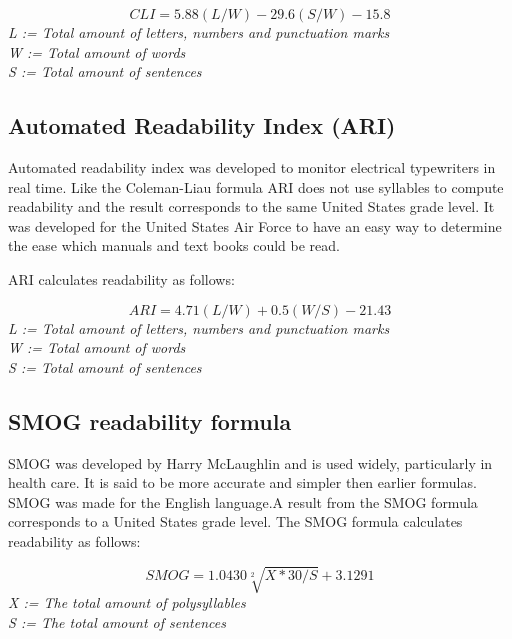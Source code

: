 \documentclass[a4paper]{article}
\begin{document}
\begin{equation}
CLI = 5.88(L/W) - 29.6(S/W) - 15.8
\end{equation}
\emph{L := Total amount of letters, numbers and punctuation marks}\\
\emph{W := Total amount of words}\\
\emph{S := Total amount of sentences}\\

\subsection{Automated Readability Index (ARI)}
Automated readability index was developed to monitor electrical typewriters in real time. Like the Coleman-Liau formula ARI does not use syllables to compute readability and the result corresponds to the same United States grade level\cite{senter67}. It was developed for the United States Air Force to have an easy way to determine the ease which manuals and text books could be read\cite{senter67}.

ARI calculates readability as follows:

\begin{equation}
ARI = 4.71(L/W) + 0.5(W/S) - 21.43
\end{equation}
\emph{L := Total amount of letters, numbers and punctuation marks}\\
\emph{W := Total amount of words}\\
\emph{S := Total amount of sentences}\\

\subsection{SMOG readability formula}

SMOG was developed by Harry McLaughlin and is used widely, particularly in health care\cite{ley96}. It is said to be more accurate and simpler then earlier formulas\cite{laughlin69}. SMOG was made for the English language.A result from the SMOG formula corresponds to a United States grade level.
 The SMOG formula calculates readability as follows:

\begin{equation}
    SMOG = 1.0430\sqrt[2]{X*30/S}+3.1291
\end{equation}
\emph{X := The total amount of polysyllables}\\
\emph{S := The total amount of sentences}\\
\end{document}
